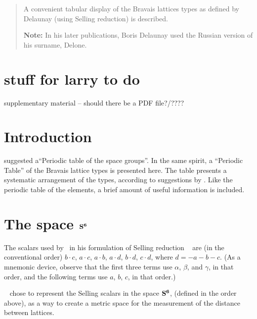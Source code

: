 \documentclass[preprint]{iucr}              %
\numberwithin{equation}{section}
\newcommand{\SVI}[0]{$\bf{S^{6}}$}
\begin{document}
	\newcommand{\ci}[0]{$c_1$}
	\newcommand{\cii}[0]{$c_2$}
	\newcommand{\ciii}[0]{$c_3$}
	
	
	\begin{abstract}
		
		A convenient tabular display of the Bravais lattices types
		as defined by Delaunay (using Selling reduction) is described.

		
		{\bf Note:}  In his later publications, Boris Delaunay used the Russian version of his surname, Delone.\\
		
		
	\end{abstract}
	
	\section{stuff for larry to do}
	supplementary material -- should there be a PDF file?/????
	
	
	\section{Introduction}
	 suggested a``Periodic table of the space groups''. In the
	same spirit, a ``Periodic Table'' of the Bravais lattice types is presented here.
	The table presents a systematic arrangement of the types, according to suggestions
	by . Like the periodic table of the elements, a brief amount
	of useful information is included.
	
\section{The space \SVI{}}
	
		The scalars used by~ in his formulation of Selling reduction ~\cite{Selling1874}
	are (in the conventional order) $b \cdot c$, $a \cdot c$, $a \cdot b$, $a \cdot d$, 
	$b \cdot d$, $c \cdot d$, where $d = -a-b-c$. 
	(As a mnemonic device, 
	observe that the first three terms use
	$\alpha$, $\beta$, and $\gamma$, 
	in that order, 
	and the following terms use $a$, $b$, $c$, in that order.)
	
	~ chose to 
	represent the Selling scalars in the space \SVI{},
	\Svec{} (defined in the order above), 
	as a way to create a metric space
	for the measurement of the distance between lattices. 
\end{document}
